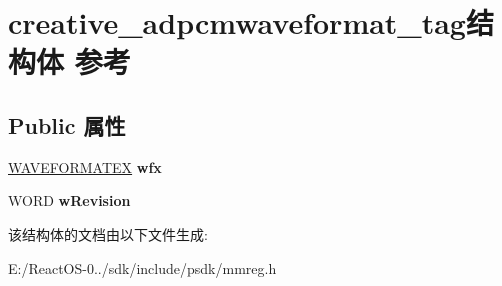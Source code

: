 \hypertarget{structcreative__adpcmwaveformat__tag}{}\section{creative\+\_\+adpcmwaveformat\+\_\+tag结构体 参考}
\label{structcreative__adpcmwaveformat__tag}
\subsection*{Public 属性}
\begin{DoxyCompactItemize}
\item 
\mbox{\label{structcreative__adpcmwaveformat__tag_a7a04be9f563f0d7f008c82a6a2d95b3d}} 
\hyperlink{struct_w_a_v_e_f_o_r_m_a_t_e_x}{W\+A\+V\+E\+F\+O\+R\+M\+A\+T\+EX} {\bfseries wfx}
\item 
\mbox{\label{structcreative__adpcmwaveformat__tag_a7eff3b2a25e552baa9db9454efeed7c5}} 
W\+O\+RD {\bfseries w\+Revision}
\end{DoxyCompactItemize}


该结构体的文档由以下文件生成\+:\begin{DoxyCompactItemize}
\item 
E\+:/\+React\+O\+S-\/0../sdk/include/psdk/mmreg.\+h\end{DoxyCompactItemize}
